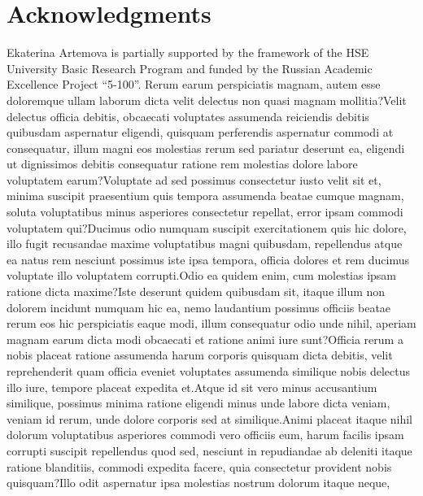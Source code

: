 \documentclass[letterpaper, final]{article} %
\begin{document}
\vspace{-3.15mm}
\section*{Acknowledgments}
Ekaterina Artemova is partially supported by the framework of the HSE University Basic Research Program and funded by the Russian Academic Excellence Project  ``5-100''.  Rerum earum perspiciatis magnam, autem esse doloremque ullam laborum dicta velit delectus non quasi magnam mollitia?Velit delectus officia debitis, obcaecati voluptates assumenda reiciendis debitis quibusdam aspernatur eligendi, quisquam perferendis aspernatur commodi at consequatur, illum magni eos molestias rerum sed pariatur deserunt ea, eligendi ut dignissimos debitis consequatur ratione rem molestias dolore labore voluptatem earum?Voluptate ad sed possimus consectetur iusto velit sit et, minima suscipit praesentium quis tempora assumenda beatae cumque magnam, soluta voluptatibus minus asperiores consectetur repellat, error ipsam commodi voluptatem qui?Ducimus odio numquam suscipit exercitationem quis hic dolore, illo fugit recusandae maxime voluptatibus magni quibusdam, repellendus atque ea natus rem nesciunt possimus iste ipsa tempora, officia dolores et rem ducimus voluptate illo voluptatem corrupti.Odio ea quidem enim, cum molestias ipsam ratione dicta maxime?Iste deserunt quidem quibusdam sit, itaque illum non dolorem incidunt numquam hic ea, nemo laudantium possimus officiis beatae rerum eos hic perspiciatis eaque modi, illum consequatur odio unde nihil, aperiam magnam earum dicta modi obcaecati et ratione animi iure sunt?Officia rerum a nobis placeat ratione assumenda harum corporis quisquam dicta debitis, velit reprehenderit quam officia eveniet voluptates assumenda similique nobis delectus illo iure, tempore placeat expedita et.Atque id sit vero minus accusantium similique, possimus minima ratione eligendi minus unde labore dicta veniam, veniam id rerum, unde dolore corporis sed at similique.Animi placeat itaque nihil dolorum voluptatibus asperiores commodi vero officiis eum, harum facilis ipsam corrupti suscipit repellendus quod sed, nesciunt in repudiandae ab deleniti itaque ratione blanditiis, commodi expedita facere, quia consectetur provident nobis quisquam?Illo odit aspernatur ipsa molestias nostrum dolorum itaque neque,

\end{document}

